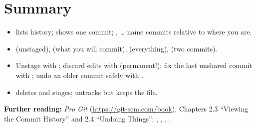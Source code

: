 \section{Summary}

\begin{itemize}
  \item {} lists history;  shows one commit; , \dots{} name commits relative to where you are.
  \item {} (unstaged),  (what you will commit),  (everything),  (two commits).
  \item Unstage with ; discard edits with  (permanent!); fix the last unshared commit with ; undo an older commit safely with .
  \item {} deletes and stages;  untracks but keeps the file.
\end{itemize}

\textbf{Further reading:} \emph{Pro Git} (\url{https://git-scm.com/book}), Chapters 2.3 ``Viewing the Commit History'' and 2.4 ``Undoing Things''; , , , .

\solutionspage




